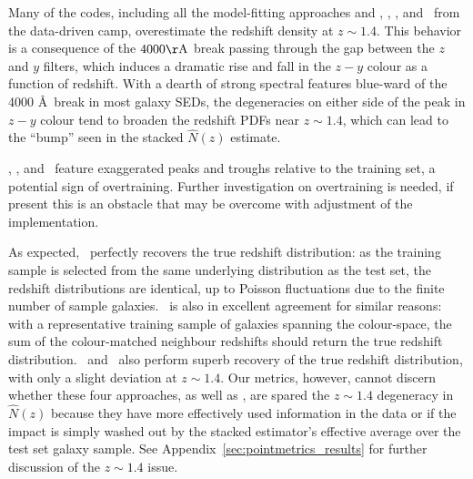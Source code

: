 Many of the codes, including all the model-fitting approaches and \annz, \gpz, \metaphor, and \skynet\ from the data-driven camp, overestimate the redshift density at $z \sim 1.4$.
This behavior is a consequence of the $4000 \rm{\AA}$ break passing through the gap between the $z$ and $y$ filters, which induces a dramatic rise and fall in the $z - y$ colour as a function of redshift.  
With a dearth of strong spectral features blue-ward of the 4000 \AA\ break in most galaxy SEDs, the degeneracies on either side of the peak in $z - y$ colour tend to broaden the redshift PDFs near $z \sim 1.4$, which can lead to the ``bump'' seen in the stacked $\hat{N}(z)$ estimate.

\annz, \gpz, and \metaphor\ feature exaggerated peaks and troughs relative to the training set, a potential sign of overtraining.
Further investigation on overtraining is needed, if present this is an obstacle that may be overcome with adjustment of the implementation.

As expected, \trainz\ perfectly recovers the true redshift distribution: as the training sample is selected from the same underlying distribution as the test set, the redshift distributions are identical, up to Poisson fluctuations due to the finite number of sample galaxies.
\cmnn\ is also in excellent agreement for similar reasons: with a representative training sample of galaxies spanning the colour-space, the sum of the colour-matched neighbour redshifts should return the true redshift distribution.
\flexzboost\ and \tpz\ also perform superb recovery of the true redshift distribution, with only a slight deviation at $z \sim 1.4$.
Our metrics, however, cannot discern whether these four approaches, as well as \delight, are spared the $z \sim 1.4$ degeneracy in $\hat{N}(z)$ because they have more effectively used information in the data or if the impact is simply washed out by the stacked estimator's effective average over the test set galaxy sample.
See Appendix~\ref{sec:pointmetrics_results} for further discussion of the $z \sim 1.4$ issue.

